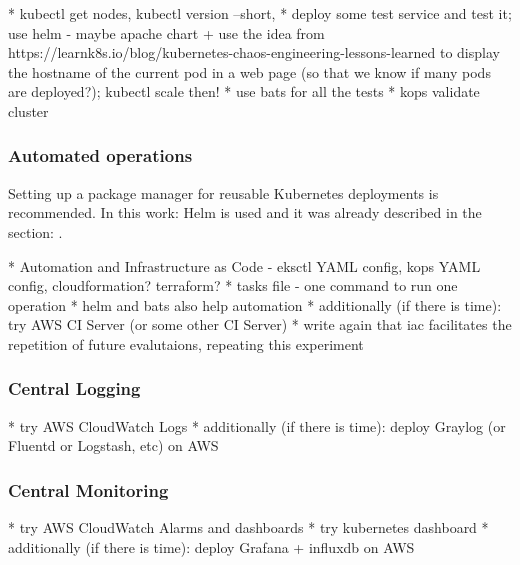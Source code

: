 * kubectl get nodes, kubectl version --short,
* deploy some test service and test it; use helm - maybe apache chart + use the idea from https://learnk8s.io/blog/kubernetes-chaos-engineering-lessons-learned to display the hostname of the current pod in a web page (so that we know if many pods are deployed?); kubectl scale then!
* use bats for all the tests
* kops validate cluster




\subsubsection{Automated operations}

Setting up a package manager for reusable Kubernetes deployments is recommended\cite{gruntwork-howto-blog}. In this work: Helm is used and it was already described in the section: .

* Automation and Infrastructure as Code - eksctl YAML config, kops YAML config, cloudformation? terraform?
* tasks file - one command to run one operation
* helm and bats also help automation
* additionally (if there is time): try AWS CI Server (or some other CI Server)
* write again that iac facilitates the repetition of future evalutaions, repeating this experiment

\subsubsection{Central Logging}

* try AWS CloudWatch Logs
* additionally (if there is time): deploy Graylog (or Fluentd or Logstash, etc) on AWS

\subsubsection{Central Monitoring}

* try AWS CloudWatch Alarms and dashboards
* try kubernetes dashboard
* additionally (if there is time): deploy Grafana + influxdb on AWS

